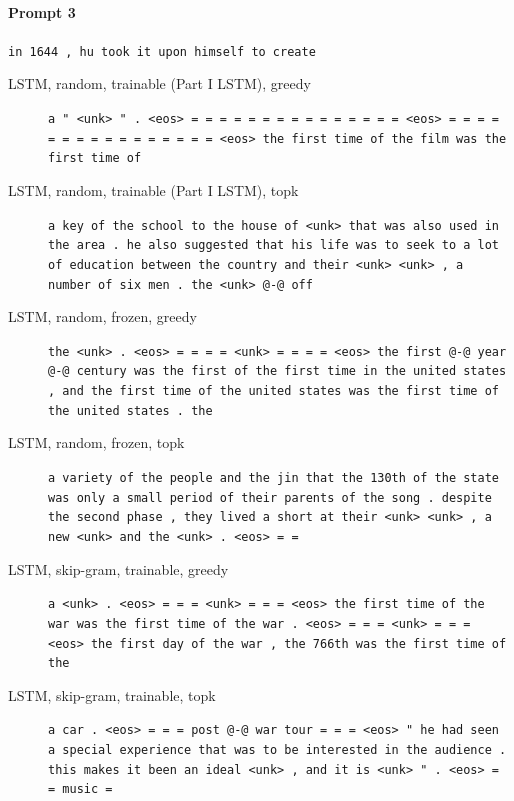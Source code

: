 \paragraph{Prompt 3} \texttt{in 1644 , hu took it upon himself to create}
\begin{description}
\item[LSTM, random, trainable (Part I LSTM), greedy] \texttt{\small a " \textless{}unk\textgreater{} " . \textless{}eos\textgreater{} = = = = = = = = = = = = = = = \textless{}eos\textgreater{} = = = = = = = = = = = = = = = = \textless{}eos\textgreater{} the first time of the film was the first time of}
\item[LSTM, random, trainable (Part I LSTM), topk] \texttt{\small a key of the school to the house of \textless{}unk\textgreater{} that was also used in the area . he also suggested that his life was to seek to a lot of education between the country and their \textless{}unk\textgreater{} \textless{}unk\textgreater{} , a number of six men . the \textless{}unk\textgreater{} @-@ off}
\item[LSTM, random, frozen, greedy] \texttt{\small the \textless{}unk\textgreater{} . \textless{}eos\textgreater{} = = = = \textless{}unk\textgreater{} = = = = \textless{}eos\textgreater{} the first @-@ year @-@ century was the first of the first time in the united states , and the first time of the united states was the first time of the united states . the}
\item[LSTM, random, frozen, topk] \texttt{\small a variety of the people and the jin that the 130th of the state was only a small period of their parents of the song . despite the second phase , they lived a short at their \textless{}unk\textgreater{} \textless{}unk\textgreater{} , a new \textless{}unk\textgreater{} and the \textless{}unk\textgreater{} . \textless{}eos\textgreater{} = =}
\item[LSTM, skip-gram, trainable, greedy] \texttt{\small a \textless{}unk\textgreater{} . \textless{}eos\textgreater{} = = = \textless{}unk\textgreater{} = = = \textless{}eos\textgreater{} the first time of the war was the first time of the war . \textless{}eos\textgreater{} = = = \textless{}unk\textgreater{} = = = \textless{}eos\textgreater{} the first day of the war , the 766th was the first time of the}
\item[LSTM, skip-gram, trainable, topk] \texttt{\small a car . \textless{}eos\textgreater{} = = = post @-@ war tour = = = \textless{}eos\textgreater{} " he had seen a special experience that was to be interested in the audience . this makes it been an ideal \textless{}unk\textgreater{} , and it is \textless{}unk\textgreater{} " . \textless{}eos\textgreater{} = = music =}

\end{description}
